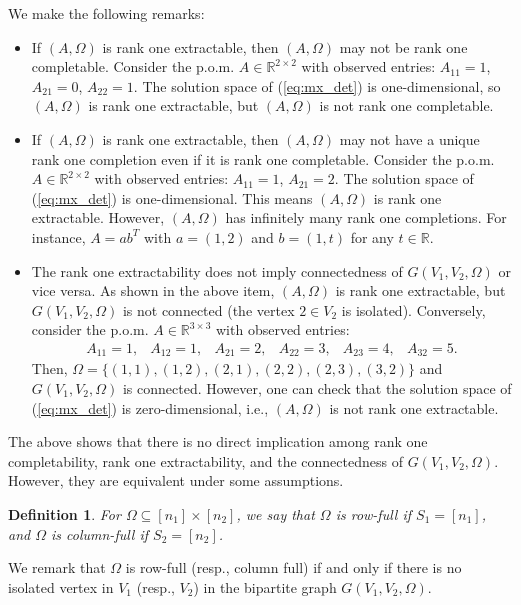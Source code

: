 \documentclass{amsart}
\newcommand{\re}{\mathbb{R}}
\newcommand{\reff}[1]{(\ref{#1})}
\newcommand{\bit}{\begin{itemize}}
\newcommand{\eit}{\end{itemize}}
\newcommand{\baray}{\begin{array}}
\newcommand{\earay}{\end{array}}
\newtheorem{defi}[theorem]{Definition}
\theoremstyle{definition}
\numberwithin{equation}{section}
\begin{document}
We make the following remarks:
\bit


\item If $(A, \Omega)$ is rank one extractable, then $(A, \Omega)$ may not be rank one completable.
Consider the p.o.m. $A \in \re^{2 \times 2}$ with observed entries:
$A_{11} = 1$, $A_{21} = 0$, $A_{22} = 1$.
The solution space of \reff{eq:mx_det} is one-dimensional,
so $(A, \Omega)$ is rank one extractable,
but $(A, \Omega)$ is not rank one completable.



\item If $(A, \Omega)$ is rank one extractable, then $(A, \Omega)$ may not have a unique rank one completion
even if it is rank one completable.
Consider the p.o.m. $A \in \re^{2 \times 2}$ with observed entries:
$A_{11} = 1$, $A_{21} = 2$.
The solution space of \reff{eq:mx_det} is one-dimensional.
This means $(A, \Omega)$ is rank one extractable.
However, $(A, \Omega)$ has infinitely many rank one completions.
For instance, $A = ab^T$ with $a = (1,2)$ and $b = (1,t)$ for any $t \in \re$.




\item The rank one extractability does not imply connectedness of $G(V_1, V_2, \Omega)$ 
or vice versa.
As shown in the above item, $(A, \Omega)$ is rank one extractable, 
but $G(V_1,V_2,\Omega)$ is not connected (the vertex $2 \in V_2$ is isolated).
Conversely, consider the p.o.m. $A \in \re^{3 \times 3}$ with observed entries:
\[
\baray{cccccc}
A_{11} = 1, & A_{12} = 1, & A_{21} = 2, & A_{22} = 3, & A_{23} = 4, & A_{32} = 5.
\earay
\]
Then, $\Omega = \{ (1,1), (1,2), (2,1), (2,2), (2,3), (3,2) \}$
and $G(V_1,V_2,\Omega)$ is connected.
However, one can check that the solution space of \reff{eq:mx_det} is zero-dimensional, 
i.e., $(A, \Omega)$ is not rank one extractable.
\eit



The above shows that there is no direct implication among rank one completability,
rank one extractability, and the connectedness of $G(V_1, V_2, \Omega)$.
However, they are equivalent under some assumptions.


\begin{defi}
For $\Omega \subseteq [n_1] \times [n_2]$, we say that $\Omega$
is row-full if $S_1 = [n_1]$, and $\Omega$ is column-full if $S_2 = [n_2]$.
\end{defi}


We remark that 
$\Omega$ is row-full (resp., column full) if and only if there is no isolated vertex in $V_1$ (resp., $V_2$)
in the bipartite graph $G(V_1, V_2, \Omega)$.
\end{document}
